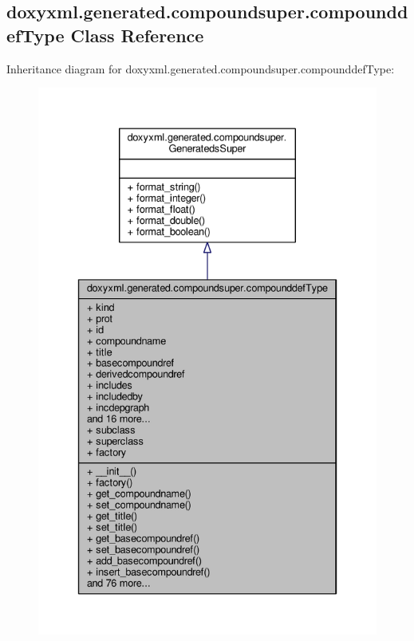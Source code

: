 \subsection{doxyxml.\+generated.\+compoundsuper.\+compounddef\+Type Class Reference}
\label{classdoxyxml_1_1generated_1_1compoundsuper_1_1compounddefType}


Inheritance diagram for doxyxml.\+generated.\+compoundsuper.\+compounddef\+Type\+:
\nopagebreak
\begin{figure}[H]
\begin{center}
\leavevmode
\includegraphics[width=334pt]{d2/dbc/classdoxyxml_1_1generated_1_1compoundsuper_1_1compounddefType__inherit__graph}
\end{center}
\end{figure}


